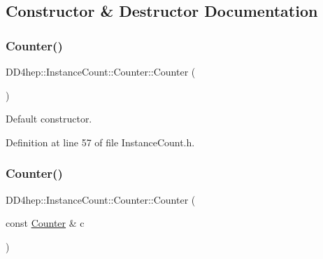 \subsection{Constructor \& Destructor Documentation}
\hypertarget{class_d_d4hep_1_1_instance_count_1_1_counter_a80741252e730cdf0cb149b77578168a0}{}\label{class_d_d4hep_1_1_instance_count_1_1_counter_a80741252e730cdf0cb149b77578168a0} 
\subsubsection{\texorpdfstring{Counter()}{Counter()}\hspace{0.1cm}{\footnotesize\ttfamily [1/2]}}
{\footnotesize\ttfamily D\+D4hep\+::\+Instance\+Count\+::\+Counter\+::\+Counter (\begin{DoxyParamCaption}{ }\end{DoxyParamCaption})\hspace{0.3cm}{\ttfamily [inline]}}



Default constructor. 



Definition at line 57 of file Instance\+Count.\+h.

\hypertarget{class_d_d4hep_1_1_instance_count_1_1_counter_aa8a1753db486e2ebee02236dee29ec66}{}\label{class_d_d4hep_1_1_instance_count_1_1_counter_aa8a1753db486e2ebee02236dee29ec66} 
\subsubsection{\texorpdfstring{Counter()}{Counter()}\hspace{0.1cm}{\footnotesize\ttfamily [2/2]}}
{\footnotesize\ttfamily D\+D4hep\+::\+Instance\+Count\+::\+Counter\+::\+Counter (\begin{DoxyParamCaption}\item[{const \hyperlink{class_d_d4hep_1_1_instance_count_1_1_counter}{Counter} \&}]{c }\end{DoxyParamCaption})\hspace{0.3cm}{\ttfamily [inline]}}



